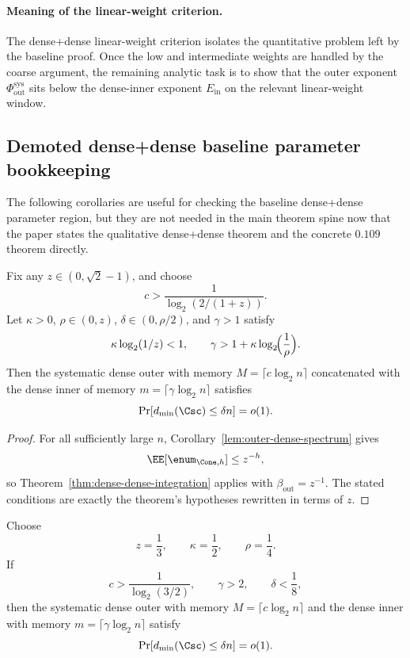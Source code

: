 \paragraph{Meaning of the linear-weight criterion.}
The dense+dense linear-weight criterion isolates the quantitative problem left by the baseline proof.  Once the low and
intermediate weights are handled by the coarse argument, the remaining analytic task is to show that the outer exponent
\(\Phi_{\mathrm{out}}^{\mathrm{sys}}\) sits below the dense-inner exponent \(E_{\mathrm{in}}\) on the relevant
linear-weight window.

\subsection{Demoted dense+dense baseline parameter bookkeeping}

The following corollaries are useful for checking the baseline dense+dense parameter region, but they are not needed in
the main theorem spine now that the paper states the qualitative dense+dense theorem and the concrete \(0.109\)
theorem directly.

\begin{corollary}
\label{cor:dense-dense-explicit-region}
Fix any \(z\in(0,\sqrt2-1)\), and choose
\[
c>\frac{1}{\log_2(2/(1+z))}.
\]
Let \(\kappa>0\), \(\rho\in(0,z)\), \(\delta\in(0,\rho/2)\), and \(\gamma>1\) satisfy
\[
\kappa\log_2(1/z)<1,
\qquad
\gamma>1+\kappa\log_2\!\Bigl(\frac{1}{\rho}\Bigr).
\]
Then the systematic dense outer with memory \(M=\lceil c\log_2 n\rceil\) concatenated with the dense inner of memory
\(m=\lceil \gamma\log_2 n\rceil\) satisfies
\[
\Pr[d_{\min}(\Csc)\le \delta n]=o(1).
\]
\end{corollary}

\begin{proof}
For all sufficiently large \(n\), Corollary~\ref{lem:outer-dense-spectrum} gives
\[
\EE[\enum_{\Cone,h}] \le z^{-h},
\]
so Theorem~\ref{thm:dense-dense-integration} applies with \(\beta_{\mathrm{out}}=z^{-1}\).
The stated conditions are exactly the theorem's hypotheses rewritten in terms of \(z\).
\end{proof}

\begin{corollary}
\label{cor:dense-dense-concrete-choice}
Choose
\[
z=\frac13,
\qquad
\kappa=\frac12,
\qquad
\rho=\frac14.
\]
If
\[
c>\frac{1}{\log_2(3/2)},
\qquad
\gamma>2,
\qquad
\delta<\frac18,
\]
then the systematic dense outer with memory \(M=\lceil c\log_2 n\rceil\) and the dense inner with memory
\(m=\lceil \gamma\log_2 n\rceil\) satisfy
\[
\Pr[d_{\min}(\Csc)\le \delta n]=o(1).
\]
\end{corollary}

